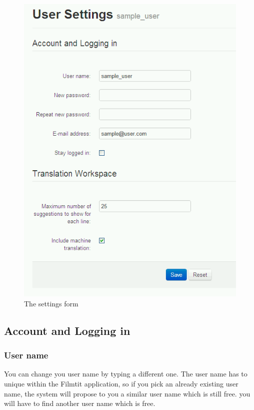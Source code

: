 \begin{figure}[h]
\begin{center}
\includegraphics[scale=0.4]{figures/user_manual/user_settings.png}
\end{center}
\caption{The settings form}
\end{figure}

\subsection{Account and Logging in}
\subsubsection{User name}

You can change you user name by typing a different one. The user name has to unique within the Filmtit application, so if you pick an already existing user name, the system will propose to you a similar user name which is still free.
you will have to find another user name which is free.

